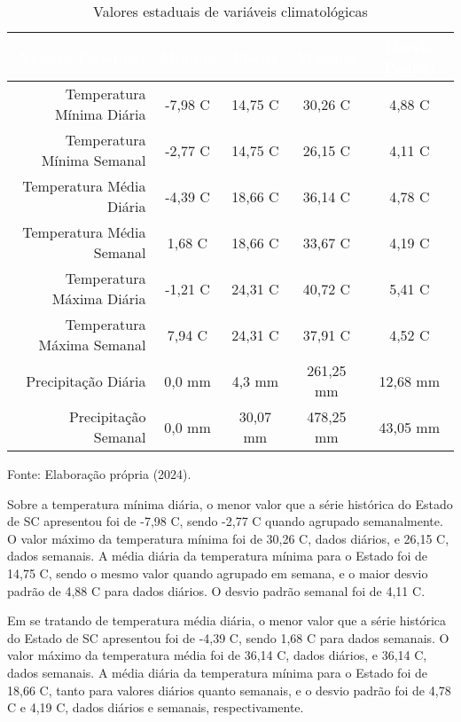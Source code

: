 \documentclass[
	12pt,				%
	openright,			%
	oneside,			%
	a4paper,			%
	english,			%
	french,				%
	spanish,			%
	brazil				%
	dvipsnames, table]{abntex2}
\begin{document}
\begin{table}[htbp]
    \begin{center}
    \caption{Valores estaduais de variáveis climatológicas}
    {
    \begin{tabular}{r|cccc}
    \hline
    \toprule
    \rowcolor{darkgray} \textcolor{white}{Valores Estaduais} & \textcolor{white}{Mínima} & \textcolor{white}{Média} & \textcolor{white}{Máxima} & \textcolor{white}{Desvio Padrão}\\
    \midrule
    Temperatura Mínima Diária & -7,98 C & 14,75 C& 30,26 C & 4,88 C\\
    Temperatura Mínima Semanal & -2,77 C & 14,75 C & 26,15 C & 4,11 C\\
    Temperatura Média Diária & -4,39 C & 18,66 C & 36,14 C & 4,78 C\\
    Temperatura Média Semanal & 1,68 C & 18,66 C & 33,67 C & 4,19 C\\
    Temperatura Máxima Diária & -1,21 C & 24,31 C & 40,72 C & 5,41 C\\
    Temperatura Máxima Semanal & 7,94 C & 24,31 C & 37,91 C & 4,52 C\\ 
    Precipitação Diária & 0,0 mm & 4,3 mm & 261,25 mm & 12,68 mm\\
    Precipitação Semanal & 0,0 mm & 30,07 mm & 478,25 mm & 43,05 mm\\
    \bottomrule
    \end{tabular}}
    \end{center}
    \label{tab:valores_climato}
    \small{Fonte: Elaboração própria (2024).}
\end{table}

\indent Sobre a temperatura mínima diária, o menor valor que a série histórica do Estado de \acrlong{SC} apresentou foi de -7,98 C, sendo -2,77 C quando agrupado semanalmente. O valor máximo da temperatura mínima foi de 30,26 C, dados diários, e 26,15 C, dados semanais. A média diária da temperatura mínima para o Estado foi de 14,75 C, sendo o mesmo valor quando agrupado em semana, e o maior desvio padrão de 4,88 C para dados diários. O desvio padrão semanal foi de 4,11 C.

\indent Em se tratando de temperatura média diária, o menor valor que a série histórica do Estado de \acrlong{SC} apresentou foi de -4,39 C, sendo 1,68 C para dados semanais. O valor máximo da temperatura média foi de 36,14 C, dados diários, e 36,14 C, dados semanais. A média diária da temperatura mínima para o Estado foi de 18,66 C, tanto para valores diários quanto semanais, e o desvio padrão foi de 4,78 C e 4,19 C, dados diários e semanais, respectivamente. 
\end{document}
